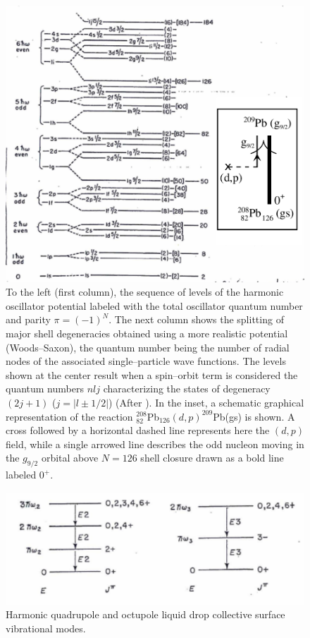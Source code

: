 \documentclass[a4paper,11pt]{book}
\numberwithin{equation}{section}
\numberwithin{figure}{section}
\numberwithin{table}{section}
\begin{document}
\begin{figure}
\centerline {
\includegraphics*[width=12cm]{introduccion/figs/figpreface3}
}
\caption{To the left (first column), the sequence of levels of the harmonic oscillator potential labeled with the total oscillator quantum number and parity $\pi=(-1)^N$. The next column shows the splitting of major shell degeneracies obtained using a more realistic potential (Woods--Saxon), the quantum number being the number of radial nodes of the associated single--particle wave functions. The levels shown at the center result when a spin--orbit term is considered the quantum numbers $nlj$ characterizing the states of degeneracy $(2j+1)$ ($j=|l\pm1/2|$) (After \cite{Mayer:63}). In the inset, a schematic graphical representation of the reaction $^{208}_{82}$Pb$_{126}(d,p)^{209}$Pb(gs) is shown. A cross followed by a horizontal dashed line represents here the $(d,p)$ field, while a  single arrowed line describes the odd nucleon moving in the $g_{9/2}$ orbital above $N=126$ shell closure drawn as a bold line labeled $0^+$.}
\label{fig1.0.3}
\end{figure}
\begin{figure}
\centerline {
\includegraphics*[width=12cm]{introduccion/figs/figpreface4}
}
\caption{Harmonic quadrupole and octupole liquid drop collective surface vibrational modes.}
\label{fig1.0.4}
\end{figure}
\end{document}
